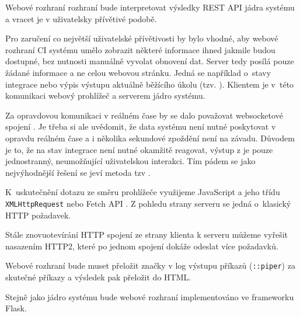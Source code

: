 Webové rozhraní rozhraní bude interpretovat výsledky REST API jádra systému a vracet je v uživatelsky přívětivé podobě.

Pro zaručení co největší uživatelské přívětivosti by bylo vhodné, aby webové rozhraní CI systému umělo zobrazit některé informace ihned jakmile budou dostupné, bez nutnosti manuálně vyvolat obnovení dat.
Server tedy posílá pouze žádané informace a ne celou webovou stránku.
Jedná se například o~stavy integrace nebo výpis výstupu aktuálně běžícího úkolu (tzv. ).
Klientem je v~této komunikaci webový prohlížeč a serverem jádro systému.

Za opravdovou komunikaci v reálném čase by se dalo považovat websocketové spojení \cite{websocket}.
Je třeba si ale uvědomit, že data systému není nutné poskytovat v opravdu reálném čase a i několika sekundové zpoždění není na závadu.
Důvodem je to, že na stav integrace není nutné okamžitě reagovat, výstup z  je pouze jednostranný, neumožňující uživatelskou interakci.
Tím pádem se jako nejvýhodnější řešení se jeví metoda tzv .

K~uskutečnění dotazu ze směru prohlížeče využijeme JavaScript a jeho třídu \verb|XMLHttpRequest| nebo Fetch API \cite{fetch_api}.
Z pohledu strany serveru se jedná o~klasický HTTP požadavek.

Stále znovuotevírání HTTP spojení ze strany klienta k serveru můžeme vyřešit nasazením HTTP2, které po jednom spojení dokáže odeslat více požadavků.

Webové rozhraní bude muset přeložit značky v log výstupu příkazů (\verb|::piper|) za skutečné příkazy a výsledek pak přeložit do HTML.

Stejně jako jádro systému bude webové rozhraní implementováno ve frameworku Flask.




